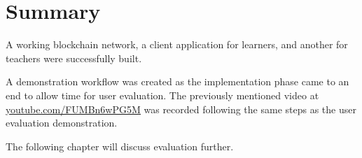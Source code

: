 \section*{Summary}

A working blockchain network, a client application for learners, and another for teachers 
were successfully built. 

A demonstration workflow was created as the implementation phase came to an end to allow 
time for user evaluation. The previously mentioned video at 
\href{https://youtu.be/FUMBn6wPG5M}{\underline{youtube.com/FUMBn6wPG5M}} 
was recorded following the same steps as the user evaluation demonstration.

The following chapter will discuss evaluation further.